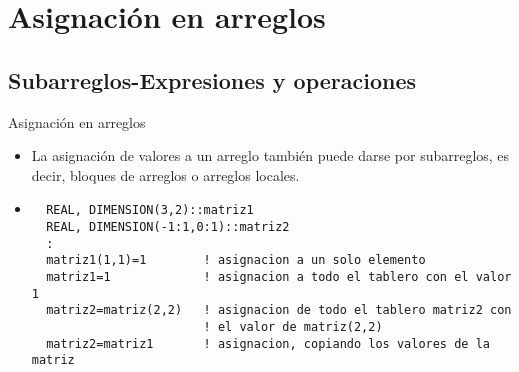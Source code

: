 
\section{Asignación en arreglos}  


\subsection{Subarreglos-Expresiones y operaciones}


\begin{frame}[fragile]{Asignación en arreglos}
 \begin{itemize}[<+(0)->]
  \item La asignación de valores a un arreglo también puede darse por subarreglos, es decir, bloques de arreglos o arreglos locales.
  \item [] 
  \begin{verbatim}
  REAL, DIMENSION(3,2)::matriz1
  REAL, DIMENSION(-1:1,0:1)::matriz2
  :
  matriz1(1,1)=1        ! asignacion a un solo elemento
  matriz1=1             ! asignacion a todo el tablero con el valor 1
  matriz2=matriz(2,2)   ! asignacion de todo el tablero matriz2 con
                        ! el valor de matriz(2,2)
  matriz2=matriz1       ! asignacion, copiando los valores de la matriz
  \end{verbatim}
 \end{itemize}
\end{frame}


